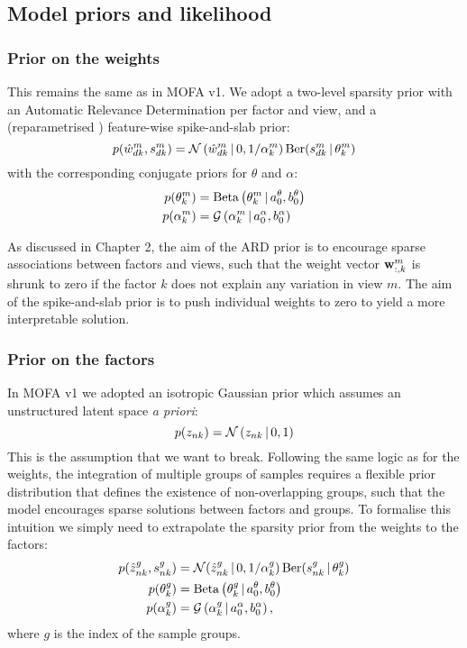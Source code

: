 \subsection{Model priors and likelihood}

\subsubsection{Prior on the weights}

This remains the same as in MOFA v1. We adopt a two-level sparsity prior with an Automatic Relevance Determination per factor and view, and a (reparametrised \cite{Titsias2011}) feature-wise spike-and-slab prior:
\begin{equation}
	p(\hat{w}_{dk}^m,s_{dk}^m) = \mathcal{N}\left(\hat{w}_{dk}^{m} \,|\, 0, 1/\alpha_{k}^{m}\right)  \text{Ber}(s_{dk}^{m} \,|\,\theta_{k}^{m})
\end{equation}
with the corresponding conjugate priors for $\theta$ and $\alpha$:
\begin{align}
	p(\theta_k^m) &= \text{Beta}\left(\theta_k^m \,|\, a_0^\theta,b_0^\theta\right)\\
	p(\alpha_k^m) &= \mathcal{G}\left(\alpha_k^m \,|\, a_0^\alpha, b_0^\alpha\right)
\end{align}

As discussed in Chapter 2, the aim of the ARD prior is to encourage sparse associations between factors and views, such that the weight vector ${\bf w}_{:,k}^m$ is shrunk to zero if the factor $k$ does not explain any variation in view $m$. The aim of the spike-and-slab prior is to push individual weights to zero to yield a more interpretable solution.

\subsubsection{Prior on the factors}

In MOFA v1 we adopted an isotropic Gaussian prior which assumes an unstructured latent space \textit{a priori}:
\begin{equation}
	p(z_{nk}) = \mathcal{N}\left(z_{nk} \,|\, 0,1\right)
\end{equation}
This is the assumption that we want to break. Following the same logic as for the weights, the integration of multiple groups of samples requires a flexible prior distribution that defines the existence of non-overlapping groups, such that the model encourages sparse solutions between factors and groups. To formalise this intuition we simply need to extrapolate the sparsity prior from the weights to the factors:
\begin{align}
	p(\hat{z}_{nk}^g,s_{nk}^g) &= \mathcal{N} (\hat{z}_{nk}^g \,|\, 0, 1/\alpha_k^g)\, \text{Ber}(s_{nk}^g \,|\,\theta_k^g) \\
	p(\theta_k^g) &= \text{Beta}\left(\theta_k^g \,|\, a_0^\theta,b_0^\theta\right) \\
	p(\alpha_k^g) &= \mathcal{G}\left(\alpha_k^g \,|\, a_0^\alpha, b_0^\alpha\right),
\end{align}
where $g$ is the index of the sample groups.

